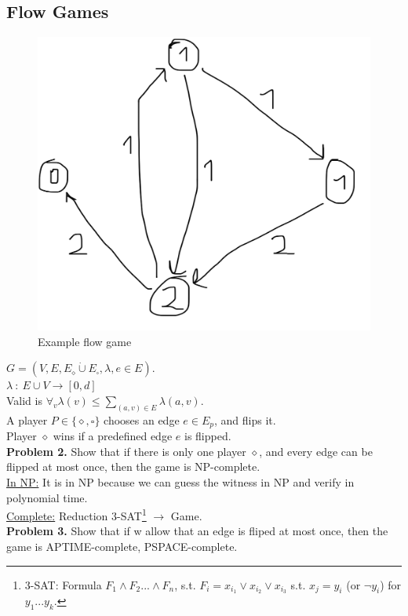 \subsection*{Flow Games}
\begin{figure}[H]
    \centering
    \caption{Example flow game}
    \includegraphics[scale=0.1]{content/graphics/game8.png}
\end{figure}
$G = (V, E, E_{\diamond} \dot\cup E_{\square}, \lambda, e \in E)$.\\
$\lambda\ :\ E \cup V \rightarrow [0, d]$\\
Valid is $\forall_{v} \lambda(v) \leq \underset{(a, v) \in E}{\sum} \lambda(a, v)$.\\
A player $P \in \{\diamond, \square\}$ chooses an edge $e \in E_p$, and flips it.\\
Player $\diamond$ wins if a predefined edge $e$ is flipped.\\
\textbf{Problem 2.} Show that if there is only one player $\diamond$, and every edge can be flipped at most once,
then the game is NP-complete.\\
\underline{In NP:} It is in NP because we can guess the witness in NP and verify in polynomial time.\\
\underline{Complete:} Reduction $3$-SAT\footnote{
    \noindent
    $3$-SAT: Formula $F_1 \land F_2 ... \land F_n$, s.t. $F_i = x_{i_1} \lor x_{i_2} \lor x_{i_3}$ s.t.
    $x_j = y_i$ (or $\lnot y_i$) for $y_1 ... y_k$.
} $\rightarrow$ Game.\\

\noindent
\textbf{Problem 3.} Show that if w allow that an edge is fliped at most once, then the game is APTIME-complete, PSPACE-complete.
